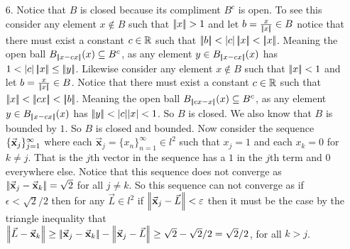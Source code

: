 \documentclass[12pt]{amsart}
\begin{document}
\begin{itemize}
   \item[6.] Notice that $B$ is closed because its compliment $B^c$ is open. 
             To see this consider any element $x\not\in B$ such that $\norm{x}>1$ and let 
             $b=\frac{x}{\norm{x}}\in B$ notice that there must exist a constant 
             $c\in\mathbb{R}$ such that $\norm{b}<|c|\norm{x}<\norm{x}$. Meaning the open ball 
             $B_{\norm{x-cx}}(x)\se B^c$, as any element $y\in B_{\norm{x-cx}}(x)$
             has $1<|c|\norm{x}\leq \norm{y}$. Likewise consider any element 
             $x\not\in B$ such that $\norm{x}<1$ and let 
             $b=\frac{x}{\norm{x}}\in B$. Notice that there must exist a constant 
             $c\in\mathbb{R}$ such that $\norm{x}<\norm{cx}<\norm{b}$. Meaning the open ball 
             $B_{\norm{cx-x}}(x)\se B^c$, as any element $y\in B_{\norm{x-cx}}(x)$
             has $\norm{y}< |c||x|<1$. So $B$ is closed.  %
             We also know that $B$ is bounded by $1$. So $B$ is closed and bounded.
             Now consider the sequence $\{\vec{\textbf x}_j\}_{j=1}^\infty$ where each 
             $\vec{\textbf{x}}_j=\{x_n\}_{n=1}^\infty\in l^2$ such that $x_j=1$ and each $x_k=0$ for $k\neq j$.
             That is the $j$th vector in the sequence has a $1$ in the $j$th term and $0$ everywhere else.
             Notice that this sequence does not converge as $\norm{\vec{\textbf{x}}_j-\vec{\textbf{x}}_k}=\sqrt{2}$ for
             all $j\neq k$. So this sequence can not converge as if $\epsilon<\sqrt{2}/2$ then for any $\vec L\in l^2$ if 
             $\norm{\vec{\textbf{x}}_j- \vec L}<\epsilon$ then it must be the case by the triangle inequality that 
             $\norm{\vec L-\vec{\textbf{x}}_k}\geq \norm{\vec{\textbf{x}}_j-\vec{\textbf{x}}_k}-\norm{\vec{\textbf{x}}_j-\vec L}\geq \sqrt{2}-\sqrt{2}/2=\sqrt{2}/2$,
             for all $k>j$.
\end{itemize}

\end{document}
